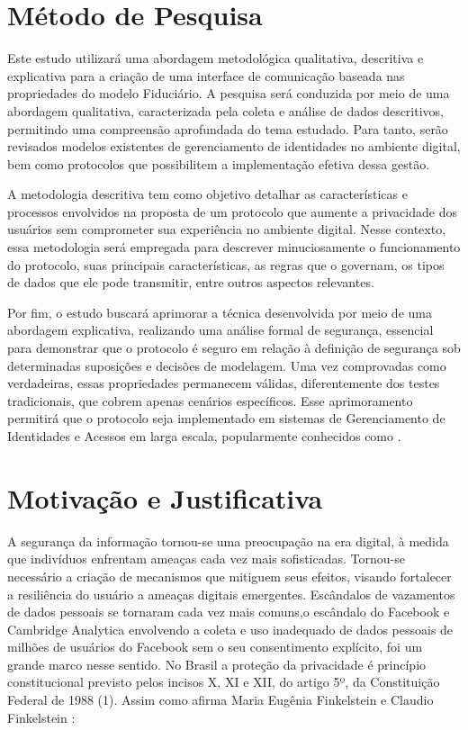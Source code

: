 \section{Método de Pesquisa}\label{section:metodologia}

Este estudo utilizará uma abordagem metodológica qualitativa, descritiva e explicativa para a criação de uma interface de comunicação baseada nas propriedades do modelo Fiduciário. A pesquisa será conduzida por meio de uma abordagem qualitativa, caracterizada pela coleta e análise de dados descritivos, permitindo uma compreensão aprofundada do tema estudado. Para tanto, serão revisados modelos existentes de gerenciamento de identidades no ambiente digital, bem como protocolos que possibilitem a implementação efetiva dessa gestão.

A metodologia descritiva tem como objetivo detalhar as características e processos envolvidos na proposta de um protocolo que aumente a privacidade dos usuários sem comprometer sua experiência no ambiente digital. Nesse contexto, essa metodologia será empregada para descrever minuciosamente o funcionamento do protocolo, suas principais características, as regras que o governam, os tipos de dados que ele pode transmitir, entre outros aspectos relevantes.

Por fim, o estudo buscará aprimorar a técnica desenvolvida por meio de uma abordagem explicativa, realizando uma análise formal de segurança, essencial para demonstrar que o protocolo é seguro em relação à definição de segurança sob determinadas suposições e decisões de modelagem. Uma vez comprovadas como verdadeiras, essas propriedades permanecem válidas, diferentemente dos testes tradicionais, que cobrem apenas cenários específicos. Esse aprimoramento permitirá que o protocolo seja implementado em sistemas de Gerenciamento de Identidades e Acessos em larga escala, popularmente conhecidos como .

\section{Motivação e Justificativa}\label{section:motivacao-justificativa}

A segurança da informação tornou-se uma preocupação na era digital, à medida que indivíduos enfrentam ameaças cada vez mais sofisticadas. Tornou-se necessário a criação de mecanismos que mitiguem seus efeitos, visando fortalecer a resiliência do usuário a ameaças digitais emergentes. Escândalos de vazamentos de dados pessoais se tornaram cada vez mais comuns,o escândalo do Facebook e Cambridge Analytica \cite{g1_facebook_2018} envolvendo a coleta e uso inadequado de dados pessoais de milhões de usuários do Facebook sem o seu consentimento explícito, foi um grande marco nesse sentido. No Brasil a proteção da privacidade é princípio constitucional previsto pelos incisos X, XI e XII, do artigo 5º, da Constituição Federal de 1988 (1). Assim como afirma Maria Eugênia Finkelstein e Claudio Finkelstein \cite{finkelstein_privacidade_2019}: 

